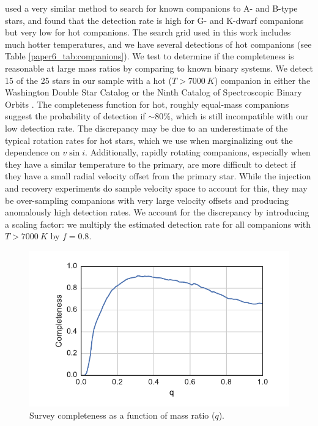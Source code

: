 \citet{Gullikson2016} used a very similar method to search for known companions to A- and B-type stars, and found that the detection rate is high for G- and K-dwarf companions but very low for hot companions. The search grid used in this work includes much hotter temperatures, and we have several detections of hot companions (see Table \ref{paper6_tab:companions}). We test to determine if the completeness is reasonable at large mass ratios by comparing to known binary systems. We detect 15 of the 25 stars in our sample with a hot ($T > 7000\ K$) companion in either the Washington Double Star Catalog \citep{WDS} or the Ninth Catalog of Spectroscopic Binary Orbits \citep{SB9}. The completeness function for hot, roughly equal-mass companions suggest the probability of detection if $\sim 80\%$, which is still incompatible with our low detection rate. The discrepancy may be due to an underestimate of the typical rotation rates for hot stars, which we use when marginalizing out the dependence on $v\sin{i}$. Additionally, rapidly rotating companions, especially when they have a similar temperature to the primary, are more difficult to detect if they have a small radial velocity offset from the primary star. While the injection and recovery experiments do sample velocity space to account for this, they may be over-sampling companions with very large velocity offsets and producing anomalously high detection rates. We account for the discrepancy by introducing a scaling factor: we multiply the estimated detection rate for all companions with $T > 7000\ K$ by $f=0.8$. 


\begin{figure}[t]
\includegraphics[width=\columnwidth]{Figures/paper6_SurveyCompleteness.pdf}
\caption{Survey completeness as a function of mass ratio ($q$).}
\label{paper6_fig:completeness}
\end{figure}

